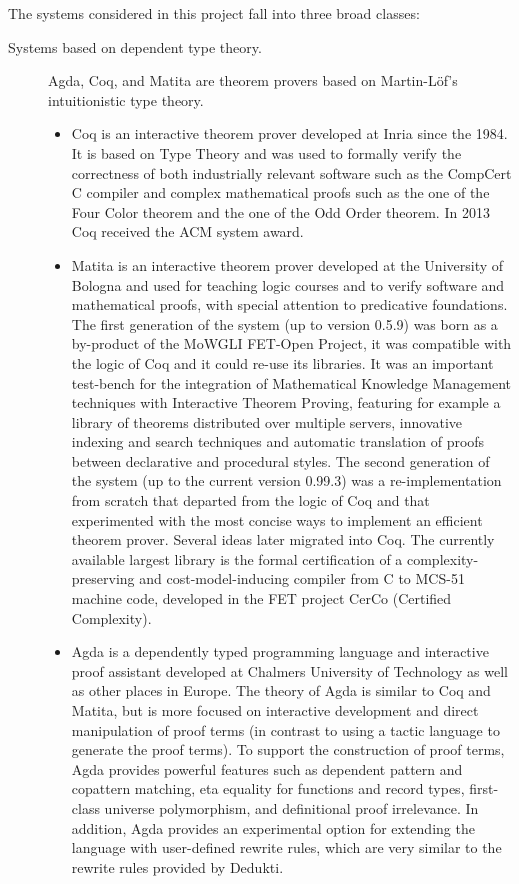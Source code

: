 The systems considered in this project fall into three broad classes:
\begin{description}

  \item[Systems based on dependent type theory.] Agda, Coq, and Matita
  are theorem provers based on Martin-L\"of's intuitionistic type
  theory.

  \begin{itemize}
    \item Coq is an interactive theorem prover developed at Inria
    since the 1984.  It is based on Type Theory and was used to
    formally verify the correctness of both industrially relevant
    software such as the CompCert C compiler and complex mathematical
    proofs such as the one of the Four Color theorem and the one of
    the Odd Order theorem. In 2013 Coq received the ACM system award.

    \item Matita is an interactive theorem prover developed at the
    University of Bologna and used for teaching logic courses and to
    verify software and mathematical proofs, with special attention to
    predicative foundations. The first generation of the system (up to
    version 0.5.9) was born as a by-product of the MoWGLI FET-Open
    Project, it was compatible with the logic of Coq and it could
    re-use its libraries. It was an important test-bench for the
    integration of Mathematical Knowledge Management techniques with
    Interactive Theorem Proving, featuring for example a library of
    theorems distributed over multiple servers, innovative indexing
    and search techniques and automatic translation of proofs between
    declarative and procedural styles. The second generation of the
    system (up to the current version 0.99.3) was a re-implementation
    from scratch that departed from the logic of Coq and that
    experimented with the most concise ways to implement an efficient
    theorem prover. Several ideas later migrated into Coq. The
    currently available largest library is the formal certification of
    a complexity-preserving and cost-model-inducing compiler from C to
    MCS-51 machine code, developed in the FET project CerCo (Certified
    Complexity).

    \item Agda is a dependently typed programming language and
    interactive proof assistant developed at Chalmers University of
    Technology as well as other places in Europe. The theory of Agda
    is similar to Coq and Matita, but is more focused on interactive
    development and direct manipulation of proof terms (in contrast to
    using a tactic language to generate the proof terms). To support
    the construction of proof terms, Agda provides powerful features
    such as dependent pattern and copattern matching, eta equality for
    functions and record types, first-class universe polymorphism, and
    definitional proof irrelevance. In addition, Agda provides an
    experimental option for extending the language with user-defined
    rewrite rules, which are very similar to the rewrite rules
    provided by Dedukti.
  \end{itemize}


\end{description}
